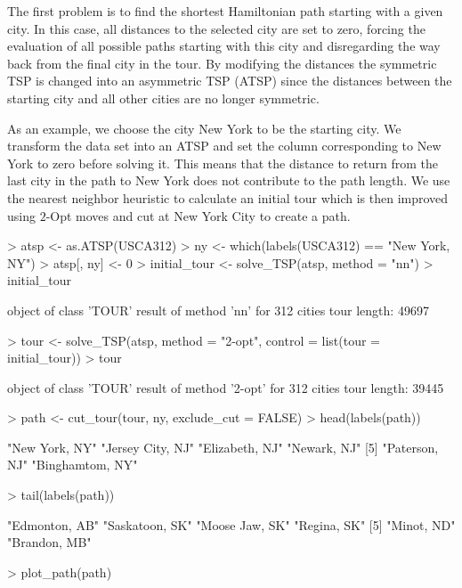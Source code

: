 \documentclass[10pt,a4paper,fleqn]{article}
\begin{document}
The first problem is to find the shortest Hamiltonian path starting with a
given city. In this case, all distances to the selected city are set to zero,
forcing the evaluation of all possible paths starting with this city and
disregarding the way back from the final city in the tour.  By modifying the
distances the symmetric TSP is changed into an asymmetric TSP  (ATSP) since the
distances between the starting city and all other cities are no longer
symmetric.

As an example, we choose the city New York to be the starting city.  We
transform the data set into an ATSP and set the column corresponding
to New York to zero before solving it. This means that the distance to
return from the last city in the path to New York does not contribute to the
path length.  We use the nearest neighbor heuristic to calculate an initial
tour which is then improved using $2$-Opt moves and cut at New York City to
create a path.



\begin{Schunk}
\begin{Sinput}
> atsp <- as.ATSP(USCA312)
> ny <- which(labels(USCA312) == "New York, NY")
> atsp[, ny] <- 0
> initial_tour <- solve_TSP(atsp, method = "nn")
> initial_tour
\end{Sinput}
\begin{Soutput}
object of class 'TOUR' 
result of method 'nn' for 312 cities
tour length: 49697 
\end{Soutput}
\begin{Sinput}
> tour <- solve_TSP(atsp, method = "2-opt", control = list(tour = initial_tour))
> tour
\end{Sinput}
\begin{Soutput}
object of class 'TOUR' 
result of method '2-opt' for 312 cities
tour length: 39445 
\end{Soutput}
\begin{Sinput}
> path <- cut_tour(tour, ny, exclude_cut = FALSE)
> head(labels(path))
\end{Sinput}
\begin{Soutput}
[1] "New York, NY"    "Jersey City, NJ" "Elizabeth, NJ"   "Newark, NJ"     
[5] "Paterson, NJ"    "Binghamtom, NY" 
\end{Soutput}
\begin{Sinput}
> tail(labels(path))
\end{Sinput}
\begin{Soutput}
[1] "Edmonton, AB"  "Saskatoon, SK" "Moose Jaw, SK" "Regina, SK"   
[5] "Minot, ND"     "Brandon, MB"  
\end{Soutput}
\end{Schunk}
\begin{Schunk}
\begin{Sinput}
> plot_path(path)
\end{Sinput}
\end{Schunk}
\end{document}
